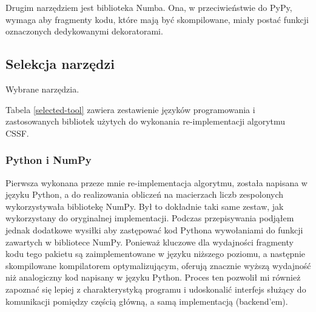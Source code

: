 \documentclass[11pt, a4paper]{article}
\begin{document}
\begin{sloppypar}
    Drugim narzędziem jest biblioteka Numba\cite{Numba_Article}\cite{Numba_Doc}. Ona, w
    przeciwieństwie do PyPy, wymaga aby fragmenty kodu, które mają być skompilowane, miały
    postać funkcji oznaczonych dedykowanymi dekoratorami.



    \subsection{Selekcja narzędzi}
    \FloatBarrier
    \begin{table}[ht]
      \centering
      
      \caption{Wybrane narzędzia.}
      \label{selected-tool}
    \end{table}
    \FloatBarrier

    Tabela \ref{selected-tool} zawiera zestawienie języków programowania i zastosowanych
    bibliotek użytych do wykonania re-implementacji algorytmu CSSF.

    \subsubsection{Python i NumPy}
    Pierwsza wykonana przeze mnie re-implementacja algorytmu, została napisana w języku Python,
    a do realizowania obliczeń na macierzach liczb zespolonych wykorzystywała bibliotekę
    NumPy. Był to dokładnie taki same zestaw, jak wykorzystany do oryginalnej
    implementacji. Podczas przepisywania podjąłem jednak dodatkowe wysiłki aby zastępować
    kod Pythona wywołaniami do funkcji zawartych w bibliotece NumPy. Ponieważ kluczowe
    dla wydajności fragmenty kodu tego pakietu są zaimplementowane w języku niższego
    poziomu, a następnie skompilowane kompilatorem optymalizującym, oferują znacznie
    wyższą wydajność niż analogiczny kod napisany w języku Python. Proces ten pozwolił mi
    również zapoznać się lepiej z charakterystyką programu i udoskonalić interfejs służący
    do komunikacji pomiędzy częścią główną, a samą implementacją (backend'em).


\end{sloppypar}
\end{document}

